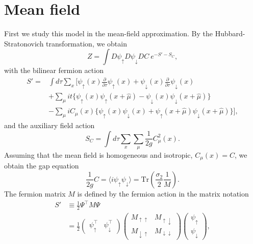 \documentclass[aps,prb,superscriptaddress,twocolumn]{revtex4-1}
\newcommand{\Tr}{\mathrm{Tr}}
\begin{document}
\section{Mean field}
\label{secMF}

First we study this model in the mean-field approximation.
By the Hubbard-Stratonovich transformation, we obtain
\begin{equation}
 Z = \int D\psi_\uparrow D\psi_\downarrow DC \ e^{ - S' - S_C } ,
\end{equation}
with the bilinear fermion action
\begin{equation}
\begin{split}
S'
=& \int d\tau \sum_x \bigg[
\psi_\uparrow(x) \frac{\partial}{\partial\tau} \psi_\uparrow(x) + \psi_\downarrow(x)  \frac{\partial}{\partial\tau} \psi_\downarrow(x)
\\
&+ \sum_\mu it \{ \psi_\uparrow(x) \psi_\uparrow(x+\hat{\mu}) - \psi_\downarrow(x) \psi_\downarrow(x+\hat{\mu}) \}
\\
&- \sum_\mu iC_\mu(x) \{ \psi_\uparrow(x) \psi_\downarrow(x) + \psi_\uparrow(x+\hat{\mu}) \psi_\downarrow(x+\hat{\mu}) \} \bigg] ,
\end{split}
\end{equation}
and the auxiliary field action
\begin{equation}
S_C = \int d\tau \sum_x \sum_\mu \frac{1}{2g} C_\mu^2 (x)
.
\end{equation}
Assuming that the mean field is homogeneous and isotropic, $C_\mu(x) = C$, we obtain the gap equation
\begin{equation}
\frac{1}{2g} C 
= \langle i \psi_\uparrow \psi_\downarrow \rangle  
= \Tr \left( \frac{\sigma_2}{2} \frac{1}{M} \right)
.
\label{eqgap}
\end{equation}
The fermion matrix $M$ is defined by the fermion action in the matrix notation
\begin{equation}
\begin{split}
 S' &\equiv \frac{1}{2} \Psi^\top M \Psi
\\
&= \frac{1}{2}
\begin{pmatrix}
\psi_\uparrow^\top & \psi_\downarrow^\top
\end{pmatrix}
\begin{pmatrix}
M_{\uparrow\uparrow} & M_{\uparrow\downarrow}
 \\
M_{\downarrow\uparrow} & M_{\downarrow\downarrow}
\end{pmatrix}
\begin{pmatrix}
\psi_\uparrow
\\
\psi_\downarrow
\end{pmatrix} ,
\end{split}
\end{equation}
\end{document}
